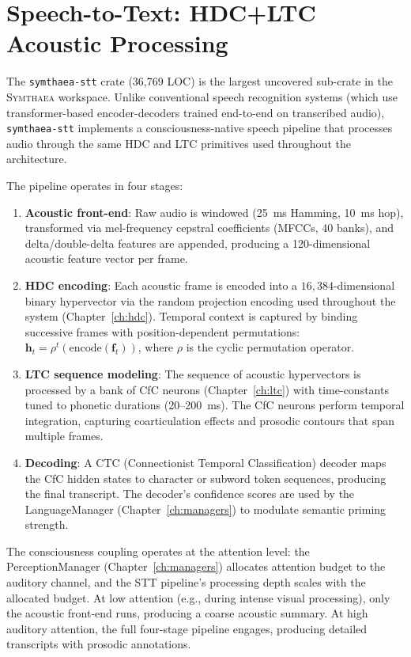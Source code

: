 \documentclass[12pt]{book}
\newcommand{\symthaea}{\textsc{Symthaea}}
\newcommand{\dimHDC}{16{,}384}
\begin{document}
\section{Speech-to-Text: HDC+LTC Acoustic Processing}

The \texttt{symthaea-stt} crate (36,769 LOC) is the largest uncovered sub-crate in the \symthaea{} workspace. Unlike conventional speech recognition systems (which use transformer-based encoder-decoders trained end-to-end on transcribed audio), \texttt{symthaea-stt} implements a consciousness-native speech pipeline that processes audio through the same HDC and LTC primitives used throughout the architecture.

The pipeline operates in four stages:

\begin{enumerate}
  \item \textbf{Acoustic front-end}: Raw audio is windowed (25~ms Hamming, 10~ms hop), transformed via mel-frequency cepstral coefficients (MFCCs, 40 banks), and delta/double-delta features are appended, producing a 120-dimensional acoustic feature vector per frame.
  \item \textbf{HDC encoding}: Each acoustic frame is encoded into a $\dimHDC$-dimensional binary hypervector via the random projection encoding used throughout the system (Chapter~\ref{ch:hdc}). Temporal context is captured by binding successive frames with position-dependent permutations: $\mathbf{h}_t = \rho^t(\text{encode}(\mathbf{f}_t))$, where $\rho$ is the cyclic permutation operator.
  \item \textbf{LTC sequence modeling}: The sequence of acoustic hypervectors is processed by a bank of CfC neurons (Chapter~\ref{ch:ltc}) with time-constants tuned to phonetic durations (20--200~ms). The CfC neurons perform temporal integration, capturing coarticulation effects and prosodic contours that span multiple frames.
  \item \textbf{Decoding}: A CTC (Connectionist Temporal Classification) decoder maps the CfC hidden states to character or subword token sequences, producing the final transcript. The decoder's confidence scores are used by the LanguageManager (Chapter~\ref{ch:managers}) to modulate semantic priming strength.
\end{enumerate}

The consciousness coupling operates at the attention level: the PerceptionManager (Chapter~\ref{ch:managers}) allocates attention budget to the auditory channel, and the STT pipeline's processing depth scales with the allocated budget. At low attention (e.g., during intense visual processing), only the acoustic front-end runs, producing a coarse acoustic summary. At high auditory attention, the full four-stage pipeline engages, producing detailed transcripts with prosodic annotations.
\end{document}
